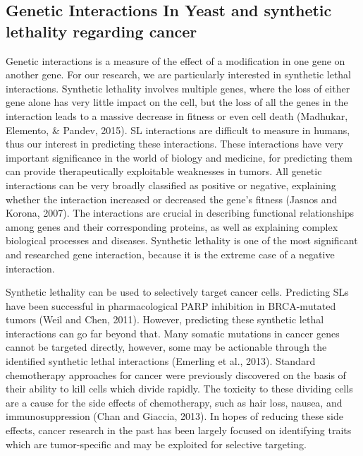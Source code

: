 \subsection{Genetic Interactions In Yeast and synthetic lethality regarding cancer} %
\label{sec:genetic_interactions}
Genetic interactions is a measure of the effect of a modification in one gene on another gene. For our research, we are particularly interested in synthetic lethal interactions. Synthetic lethality involves multiple genes, where the loss of either gene alone has very little impact on the cell, but the loss of all the genes in the interaction leads to a massive decrease in fitness or even cell death (Madhukar, Elemento, \& Pandev, 2015). SL interactions are difficult to measure in humans, thus our interest in predicting these interactions. These interactions have very important significance in the world of biology and medicine, for predicting them can provide therapeutically exploitable weaknesses in tumors. All genetic interactions can be very broadly classified as positive or negative, explaining whether the interaction increased or decreased the gene’s fitness (Jasnos and Korona, 2007). The interactions are crucial in describing functional relationships among genes and their corresponding proteins, as well as explaining complex biological processes and diseases. Synthetic lethality is one of the most significant and researched gene interaction, because it is the extreme case of a negative interaction.

Synthetic lethality can be used to selectively target cancer cells. Predicting SLs have been successful in pharmacological PARP inhibition in BRCA-mutated tumors (Weil and Chen, 2011). However, predicting these synthetic lethal interactions can go far beyond that. Many somatic mutations in cancer genes cannot be targeted directly, however, some may be actionable through the identified synthetic lethal interactions (Emerling et al., 2013). Standard chemotherapy approaches for cancer were previously discovered on the basis of their ability to kill cells which divide rapidly. The toxicity to these dividing cells are a cause for the side effects of chemotherapy, such as hair loss, nausea, and immunosuppression (Chan and Giaccia, 2013). In hopes of reducing these side effects, cancer research in the past has been largely focused on identifying traits which are tumor-specific and may be exploited for selective targeting. 

